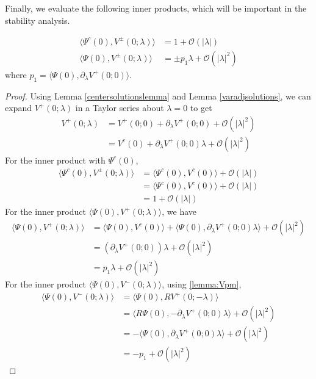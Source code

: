 \documentclass[thesis.tex]{subfiles}
\begin{document}
Finally, we evaluate the following inner products, which will be important in the stability analysis.

\begin{corollary}\label{lemma:VpmPsiIP}
\begin{equation}\label{VpmIPs}
\begin{aligned}
\langle \Psi^c(0), V^\pm(0; \lambda) \rangle &= 1 + \mathcal{O}(|\lambda|) \\
\langle \Psi(0), V^\pm(0; \lambda) \rangle &= \pm p_1 \lambda + \mathcal{O}(|\lambda|^2)
\end{aligned}
\end{equation}
where $p_1 = \langle \Psi(0), \partial_\lambda V^+(0; 0) \rangle$.
\begin{proof}
Using Lemma \ref{centersolutionslemma} and Lemma \ref{varadjsolutions}, we can expand $V^+(0; \lambda)$ in a Taylor series about $\lambda = 0$ to get
\begin{align*}
V^+(0; \lambda) &= V^+(0; 0) + \partial_\lambda V^+(0; 0) + \mathcal{O}(|\lambda|^2) \\
&= V^c(0) + \partial_\lambda V^+(0; 0) \lambda + \mathcal{O}(|\lambda|^2) 
\end{align*}
For the inner product with $\Psi^c(0)$,
\begin{align*}
\langle \Psi^c(0), V^\pm(0; \lambda) \rangle &= 
\langle \Psi^c(0), V^c(0) \rangle + \mathcal{O}(|\lambda|) \\
&= \langle \Psi^c(0), V^c(0) \rangle + \mathcal{O}(|\lambda|) \\
&= 1 + \mathcal{O}(|\lambda|)
\end{align*}
For the inner product $\langle \Psi(0), V^+(0; \lambda) \rangle$, we have
\begin{align*}
\langle \Psi(0), V^+(0; \lambda) \rangle 
&= \langle \Psi(0), V^c(0) \rangle + \langle \Psi(0), \partial_\lambda V^+(0; 0) \lambda \rangle + \mathcal{O}(|\lambda|^2) \\
&= (\partial_\lambda V^+(0; 0)) \lambda + \mathcal{O}(|\lambda|^2) \\
&= p_1 \lambda + \mathcal{O}(|\lambda|^2)
\end{align*}
For the inner product $\langle \Psi(0), V^-(0; \lambda) \rangle$, using \cref{lemma:Vpm},
\begin{align*}
\langle \Psi(0), V^-(0; \lambda) \rangle &= 
\langle \Psi(0), R V^+(0; -\lambda) \rangle \\
&= \langle R \Psi(0), -\partial_\lambda V^+(0; 0) \lambda \rangle + \mathcal{O}(|\lambda|^2) \\
&= -\langle \Psi(0), \partial_\lambda V^+(0; 0) \lambda \rangle + \mathcal{O}(|\lambda|^2) \\
&= -p_1 + \mathcal{O}(|\lambda|^2)
\end{align*}
\end{proof}
\end{corollary}


\iffulldocument\else
	
	
\fi
\end{document}

